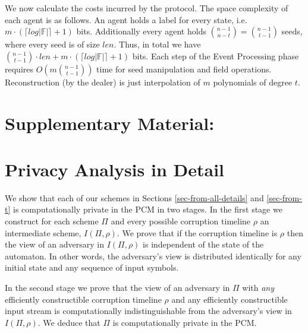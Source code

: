 \documentclass[letterpaper,11pt]{article}
\newcommand{\ignore}[1]{}
               {}
\newcommand{\len}{\mathit{len}}
\begin{document}
We now calculate the costs incurred by the protocol.  The space
complexity of each agent is as follows. An agent holds a label for
every state, i.e. $m\cdot (\lceil log |\mathbb{F}| \rceil +1)$
bits. Additionally every agent holds $ {n-1 \choose n-t}={n-1 \choose \ t-1}$ seeds, where every seed is of size $\len$. Thus, in total we have ${n-1 \choose \ t-1}\cdot \len + m\cdot (\lceil log |\mathbb{F}| \rceil +1)$
bits. Each step of the Event Processing phase requires $O(m {n-1 \choose \ t-1})$ time for seed manipulation and field
operations. Reconstruction (by the dealer)
is just interpolation of $m$ polynomials of degree $t$.

\newpage
\section*{Supplementary Material:}
\section{Privacy Analysis in Detail \label{sec-priv-ana}}

\ignore{
\todo{I started reading the proofs but got confused a little.  I modified and moved the definitions part to prelims.  I wrote my own proofs in previous sections.  I am not 100\% convinced by my proofs, so please adjust and/or check if they make sense. I think the rest of this section can go.

 Also, you guys pay a lot of attention to the PRG syntax (and other minute details).  Usually in crypto papers it is taken for granted, and people don't write it all out.}

} 
We show that each of our schemes in Sections
\ref{sec-from-all-details} and \ref{sec-from-t} is computationally
private in the PCM in two stages. In the first stage we construct for
each scheme $\Pi$ and every possible corruption timeline $\rho$ an
intermediate scheme, $I(\Pi, \rho)$. We prove that if the corruption
timeline is $\rho$ then the view of an adversary in $I(\Pi, \rho)$ is
independent of the state of the automaton. In other words, the
adversary's view is distributed identically for any initial state and
any sequence of input symbols.

In the second stage we prove that the view of an adversary in $\Pi$
with {\em any} efficiently constructible corruption timeline $\rho$
and any efficiently constructible input stream is computationally
indistinguishable from the adversary's view in $I(\Pi, \rho)$. We
deduce that $\Pi$ is computationally private in the PCM.
\end{document}
